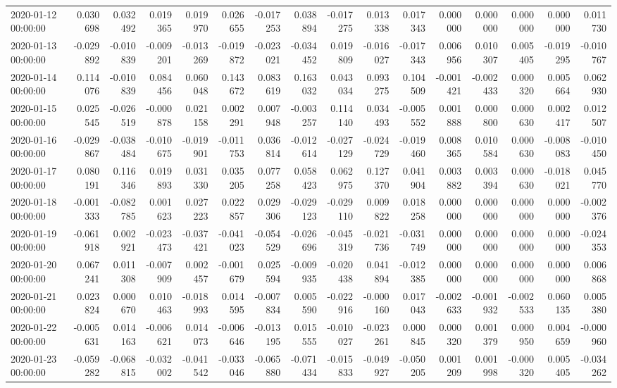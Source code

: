 \begin{tabular}{lrrrrrrrrrrrrrrr}
2020-01-12 00:00:00 & 0.030698 & 0.032492 & 0.019365 & 0.019970 & 0.026655 & -0.017253 & 0.038894 & -0.017275 & 0.013338 & 0.017343 & 0.000000 & 0.000000 & 0.000000 & 0.000000 & 0.011730 \\
2020-01-13 00:00:00 & -0.029892 & -0.010839 & -0.009201 & -0.013269 & -0.019872 & -0.023021 & -0.034452 & 0.019809 & -0.016027 & -0.017343 & 0.006956 & 0.010307 & 0.005405 & -0.019295 & -0.010767 \\
2020-01-14 00:00:00 & 0.114076 & -0.010839 & 0.084456 & 0.060048 & 0.143672 & 0.083619 & 0.163032 & 0.043034 & 0.093275 & 0.104509 & -0.001421 & -0.002433 & 0.000320 & 0.005664 & 0.062930 \\
2020-01-15 00:00:00 & 0.025545 & -0.026519 & -0.000878 & 0.021158 & 0.002291 & 0.007948 & -0.003257 & 0.114140 & 0.034493 & -0.005552 & 0.001888 & 0.000800 & 0.000630 & 0.002417 & 0.012507 \\
2020-01-16 00:00:00 & -0.029867 & -0.038484 & -0.010675 & -0.019901 & -0.011753 & 0.036814 & -0.012614 & -0.027129 & -0.024729 & -0.019460 & 0.008365 & 0.010584 & 0.000630 & -0.008083 & -0.010450 \\
2020-01-17 00:00:00 & 0.080191 & 0.116346 & 0.019893 & 0.031330 & 0.035205 & 0.077258 & 0.058423 & 0.062975 & 0.127370 & 0.041904 & 0.003882 & 0.003394 & 0.000630 & -0.018021 & 0.045770 \\
2020-01-18 00:00:00 & -0.001333 & -0.082785 & 0.001623 & 0.027223 & 0.022857 & 0.029306 & -0.029123 & -0.029110 & 0.009822 & 0.018258 & 0.000000 & 0.000000 & 0.000000 & 0.000000 & -0.002376 \\
2020-01-19 00:00:00 & -0.061918 & 0.002921 & -0.023473 & -0.037421 & -0.041023 & -0.054529 & -0.026696 & -0.045319 & -0.021736 & -0.031749 & 0.000000 & 0.000000 & 0.000000 & 0.000000 & -0.024353 \\
2020-01-20 00:00:00 & 0.067241 & 0.011308 & -0.007909 & 0.002457 & -0.001679 & 0.025594 & -0.009935 & -0.020438 & 0.041894 & -0.012385 & 0.000000 & 0.000000 & 0.000000 & 0.000000 & 0.006868 \\
2020-01-21 00:00:00 & 0.023824 & 0.000670 & 0.010463 & -0.018993 & 0.014595 & -0.007834 & 0.005590 & -0.022916 & -0.000160 & 0.017043 & -0.002633 & -0.001932 & -0.002533 & 0.060135 & 0.005380 \\
2020-01-22 00:00:00 & -0.005631 & 0.014163 & -0.006621 & 0.014073 & -0.006646 & -0.013195 & 0.015555 & -0.010027 & -0.023261 & 0.000845 & 0.000320 & 0.001379 & 0.000950 & 0.004659 & -0.000960 \\
2020-01-23 00:00:00 & -0.059282 & -0.068815 & -0.032002 & -0.041542 & -0.033046 & -0.065880 & -0.071434 & -0.015833 & -0.049927 & -0.050205 & 0.001209 & 0.001998 & -0.000320 & 0.005405 & -0.034262 \\

\end{tabular}
